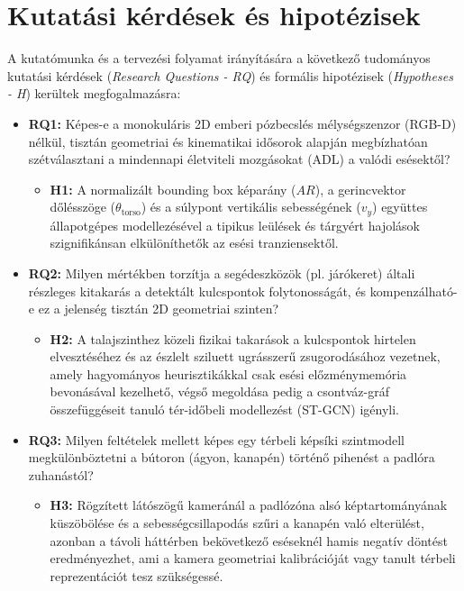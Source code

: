 \documentclass[12pt,a4paper,oneside]{report}
\begin{document}
\section{Kutatási kérdések és hipotézisek}
A kutatómunka és a tervezési folyamat irányítására a következő tudományos kutatási kérdések (\textit{Research Questions - RQ}) és formális hipotézisek (\textit{Hypotheses - H}) kerültek megfogalmazásra:
\begin{itemize}
    \item \textbf{RQ1:} Képes-e a monokuláris 2D emberi pózbecslés mélységszenzor (RGB-D) nélkül, tisztán geometriai és kinematikai idősorok alapján megbízhatóan szétválasztani a mindennapi életviteli mozgásokat (ADL) a valódi esésektől?
    \begin{itemize}
        \item \textbf{H1:} A normalizált bounding box képarány ($AR$), a gerincvektor dőlésszöge ($\theta_{\text{torso}}$) és a súlypont vertikális sebességének ($v_y$) együttes állapotgépes modellezésével a tipikus leülések és tárgyért hajolások szignifikánsan elkülöníthetők az esési tranziensektől.
    \end{itemize}
    \item \textbf{RQ2:} Milyen mértékben torzítja a segédeszközök (pl. járókeret) általi részleges kitakarás a detektált kulcspontok folytonosságát, és kompenzálható-e ez a jelenség tisztán 2D geometriai szinten?
    \begin{itemize}
        \item \textbf{H2:} A talajszinthez közeli fizikai takarások a kulcspontok hirtelen elvesztéséhez és az észlelt sziluett ugrásszerű zsugorodásához vezetnek, amely hagyományos heurisztikákkal csak esési előzménymemória bevonásával kezelhető, végső megoldása pedig a csontváz-gráf összefüggéseit tanuló tér-időbeli modellezést (ST-GCN) igényli.
    \end{itemize}
    \item \textbf{RQ3:} Milyen feltételek mellett képes egy térbeli képsíki szintmodell megkülönböztetni a bútoron (ágyon, kanapén) történő pihenést a padlóra zuhanástól?
    \begin{itemize}
        \item \textbf{H3:} Rögzített látószögű kameránál a padlózóna alsó képtartományának küszöbölése és a sebességcsillapodás szűri a kanapén való elterülést, azonban a távoli háttérben bekövetkező eséseknél hamis negatív döntést eredményezhet, ami a kamera geometriai kalibrációját vagy tanult térbeli reprezentációt tesz szükségessé.

\end{itemize}
\end{itemize}
\end{document}
